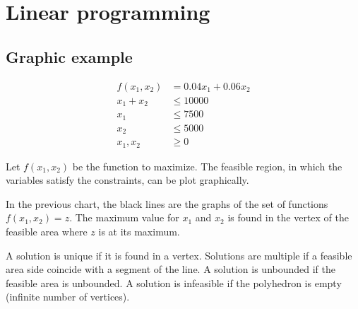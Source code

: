 \section{Linear programming}

\subsection{Graphic example}

\begin{align*}
    f(x_1, x_2) & = 0.04 x_1 + 0.06 x_2 \\
    x_1 + x_2 & \le 10000 \\
    x_1 & \le 7500 \\
    x_2 & \le 5000 \\
    x_1, x_2 & \ge 0
\end{align*}

Let $f(x_1, x_2)$ be the function to maximize.
The feasible region, in which the variables satisfy the constraints, can be plot graphically.

\begin{figure}[H]
    \centering
\end{figure}

In the previous chart, the black lines are the graphs of the set of functions $f(x_1, x_2) = z$.
The maximum value for $x_1$ and $x_2$ is found in the vertex of the feasible area where $z$ is at its maximum.

A solution is unique if it is found in a vertex.
Solutions are multiple if a feasible area side coincide with a segment of the line.
A solution is unbounded if the feasible area is unbounded.
A solution is infeasible if the polyhedron is empty (infinite number of vertices).

